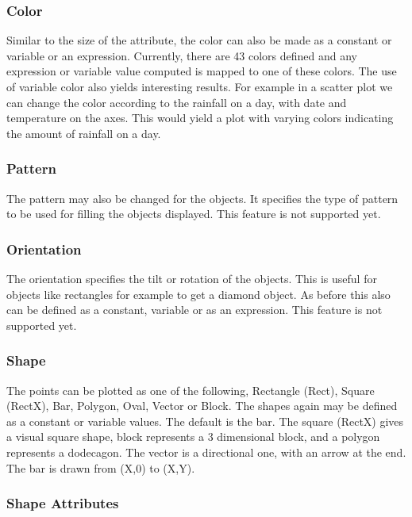 \subsubsection{Color}

Similar to the size of the attribute, the color can also be made as a
constant or variable or an expression. Currently, there are 43 colors
defined and any expression or variable value computed is mapped to one
of these colors. The use of variable color also yields interesting
results. For example in a scatter plot we can change the color
according to the rainfall on a day, with date and temperature on the
axes. This would yield a plot with varying colors indicating the
amount of rainfall on a day.

\subsubsection{Pattern}

The pattern may also be changed for the objects. It specifies the type
of pattern to be used for filling the objects displayed. This feature
is not supported yet.

\subsubsection{Orientation}

The orientation specifies the tilt or rotation of the objects. This is
useful for objects like rectangles for example to get a diamond
object. As before this also can be defined as a constant, variable or
as an expression. This feature is not supported yet.

\subsubsection{Shape}

The points can be plotted as one of the following, Rectangle (Rect),
Square (RectX), Bar, Polygon, Oval, Vector or Block. The shapes again
may be defined as a constant or variable values. The default is the
bar. The square (RectX) gives a visual square shape, block represents
a 3 dimensional block, and a polygon represents a dodecagon. The
vector is a directional one, with an arrow at the end. The bar is
drawn from (X,0) to (X,Y).

\subsubsection{Shape Attributes}

